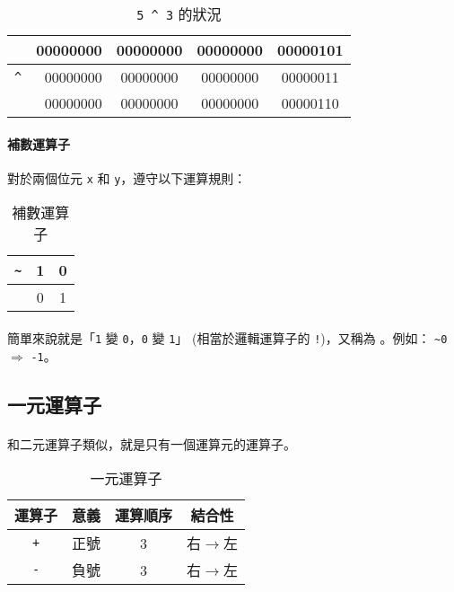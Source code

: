 \documentclass[12pt,a4paper,oneside]{report}
\begin{document}
\begin{CJK}{UTF8}{bkai}
\begin{table}[h!]
\centering
\begin{tabular}{|c|r|c|c|c|}
\hline
 & 00000000 & 00000000 & 00000000 & 00000{\color{red}101}\\
\hline
\lstinline!^! & 00000000 & 00000000 & 00000000 & 00000{\color{red}011}\\
\hline\hline
 & 00000000 & 00000000 & 00000000 & 00000{\color{red}110}\\
\hline
\end{tabular}
\caption{\lstinline!5 ^ 3! 的狀況}
\label{basic:cpp:table:5:xor:3}
\end{table}

\paragraph{補數運算子}對於兩個位元 \lstinline!x! 和 \lstinline!y!，遵守以下運算規則：

\begin{table}[h!]
\centering
\begin{tabular}{|c||c|c|}
\hline
\lstinline!~! & \textbf{1} & \textbf{0}\\
\hline
 & 0         & 1\\
\hline
\end{tabular}
\caption{補數運算子}
\label{basic:cpp:table:operator:complement}
\end{table}

\paragraph{}簡單來說就是「\lstinline!1! 變 \lstinline!0!，\lstinline!0! 變 \lstinline!1!」 (相當於邏輯運算子的 \lstinline"!")，又稱為 。例如： \lstinline!~0! $\Rightarrow$ \lstinline!-1!。

\subsection{一元運算子}

\paragraph{}和二元運算子類似，就是只有一個運算元的運算子。
\begin{table}[h!]
\centering
\begin{tabular}{|c|c|c|c|}
\hline
運算子 & 意義 & 運算順序 & 結合性\\
\hline
\lstinline!+! & 正號 & 3 & 右$\rightarrow$左\\
\hline
\lstinline!-! & 負號 & 3 & 右$\rightarrow$左\\
\hline
\end{tabular}
\caption{一元運算子}
\label{basic:cpp:table:operator:uniary}
\end{table}


\end{CJK}
\end{document}
